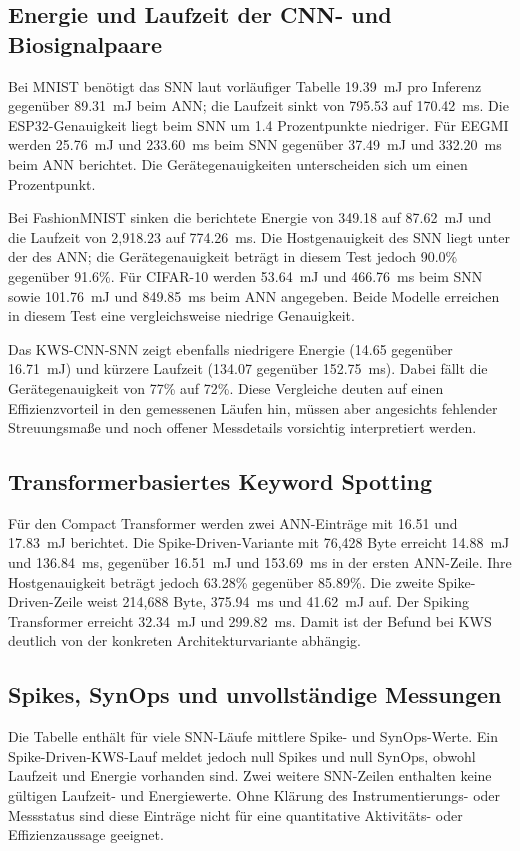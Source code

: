 \documentclass[11pt,a4paper]{article}
\begin{document}
\subsection{Energie und Laufzeit der CNN- und Biosignalpaare}
Bei MNIST benötigt das SNN laut vorläufiger Tabelle 19.39~mJ pro Inferenz gegenüber 89.31~mJ beim ANN; die Laufzeit sinkt von 795.53 auf 170.42~ms. Die ESP32-Genauigkeit liegt beim SNN um 1.4 Prozentpunkte niedriger. Für EEGMI werden 25.76~mJ und 233.60~ms beim SNN gegenüber 37.49~mJ und 332.20~ms beim ANN berichtet. Die Gerätegenauigkeiten unterscheiden sich um einen Prozentpunkt.

Bei FashionMNIST sinken die berichtete Energie von 349.18 auf 87.62~mJ und die Laufzeit von 2,918.23 auf 774.26~ms. Die Hostgenauigkeit des SNN liegt unter der des ANN; die Gerätegenauigkeit beträgt in diesem Test jedoch 90.0\% gegenüber 91.6\%. Für CIFAR-10 werden 53.64~mJ und 466.76~ms beim SNN sowie 101.76~mJ und 849.85~ms beim ANN angegeben. Beide Modelle erreichen in diesem Test eine vergleichsweise niedrige Genauigkeit.

Das KWS-CNN-SNN zeigt ebenfalls niedrigere Energie (14.65 gegenüber 16.71~mJ) und kürzere Laufzeit (134.07 gegenüber 152.75~ms). Dabei fällt die Gerätegenauigkeit von 77\% auf 72\%. Diese Vergleiche deuten auf einen Effizienzvorteil in den gemessenen Läufen hin, müssen aber angesichts fehlender Streuungsmaße und noch offener Messdetails vorsichtig interpretiert werden.

\subsection{Transformerbasiertes Keyword Spotting}
Für den Compact Transformer werden zwei ANN-Einträge mit 16.51 und 17.83~mJ berichtet. Die Spike-Driven-Variante mit 76,428 Byte erreicht 14.88~mJ und 136.84~ms, gegenüber 16.51~mJ und 153.69~ms in der ersten ANN-Zeile. Ihre Hostgenauigkeit beträgt jedoch 63.28\% gegenüber 85.89\%. Die zweite Spike-Driven-Zeile weist 214,688 Byte, 375.94~ms und 41.62~mJ auf. Der Spiking Transformer erreicht 32.34~mJ und 299.82~ms. Damit ist der Befund bei KWS deutlich von der konkreten Architekturvariante abhängig.

\subsection{Spikes, SynOps und unvollständige Messungen}
Die Tabelle enthält für viele SNN-Läufe mittlere Spike- und SynOps-Werte. Ein Spike-Driven-KWS-Lauf meldet jedoch null Spikes und null SynOps, obwohl Laufzeit und Energie vorhanden sind. Zwei weitere SNN-Zeilen enthalten keine gültigen Laufzeit- und Energiewerte. Ohne Klärung des Instrumentierungs- oder Messstatus sind diese Einträge nicht für eine quantitative Aktivitäts- oder Effizienzaussage geeignet.
\end{document}
